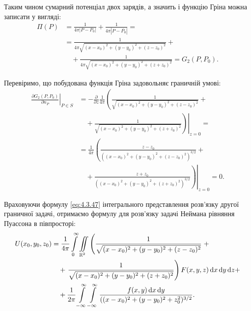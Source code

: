 Таким чином сумарний потенціал двох зарядів, а значить і функцію Гріна можна записати у вигляді:
\begin{equation}
	\begin{aligned}
		\Pi(P) &= \frac{1}{4 \pi |P - P_0|} + \frac{1}{4 \pi |P - \overline{P_0}|} = \\
		& = \frac{1}{4 \pi \sqrt{(x - x_0)^2 + (y - y_0)^2 + (z - z_0)^2}} + \\
		& \quad + \frac{1}{4 \pi \sqrt{(x - x_0)^2 + (y - y_0)^2 + (z + z_0)^2}} = G_2(P, P_0).
	\end{aligned}
\end{equation}

Перевіримо, що побудована функція Гріна задовольняє граничній умові:
\begin{equation}
	\begin{aligned}
		\left. \frac{\partial G_2(P, P_0)}{\partial n_P} \right|_{P \in S} &= - \frac{\partial}{\partial z} \frac{1}{4 \pi} \left( \frac{1}{\sqrt{(x - x_0)^2 + (y - y_0)^2 + (z - z_0)^2}} \right. + \\
		& \quad + \left. \left. \frac{1}{\sqrt{(x - x_0)^2 + (y - y_0)^2 + (z + z_0)^2}} \right) \right|_{z = 0} = \\
		& = \frac{1}{4 \pi} \left( \frac{z - z_0}{((x - x_0)^2 + (y - y_0)^2 + (z - z_0)^2)^{3/2}} \right. + \\
		& \quad + \left. \left. \frac{z + z_0}{((x - x_0)^2 + (y - y_0)^2 + (z + z_0)^2)^{3/2}} \right) \right|_{z = 0} = 0.
	\end{aligned}
\end{equation}

Враховуючи формулу \eqref{eq:4.3.47} інтегрального представлення розв'язку другої граничної задачі, отримаємо формулу для розв'язку задачі Неймана рівняння Пуассона в півпросторі:
\begin{equation}
	\begin{aligned}
		U(x_0, y_0, z_0) &= \frac{1}{4 \pi} \displaystyle\int\limits_0^\infty \displaystyle\iint\limits_{\mathbb{R}^2} \left( \frac{1}{\sqrt{(x - x_0)^2 + (y - y_0)^2 + (z - z_0)^2}} \right. + \\
		& \quad + \left. \frac{1}{\sqrt{(x - x_0)^2 + (y - y_0)^2 + (z + z_0)^2}} \right) F(x, y, z) \mathop{}\!\mathrm{d} x \mathop{}\!\mathrm{d} y \mathop{}\!\mathrm{d} z + \\
		& \quad + \frac{1}{2 \pi} \displaystyle\int\limits_{-\infty}^\infty \displaystyle\int\limits_{-\infty}^\infty \frac{f(x, y) \mathop{}\!\mathrm{d} x \mathop{}\!\mathrm{d} y}{((x - x_0)^2 + (y - y_0)^2 + z_0^2)^{3/2}}.
	\end{aligned}
\end{equation}

